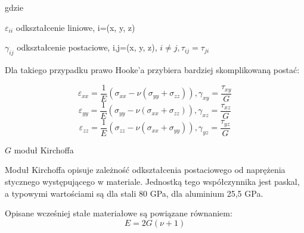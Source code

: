 gdzie

\begin{eqwhere}[2cm]
        \item[$\varepsilon_{ii}$] odkształcenie liniowe, i=(x, y, z)
        \item[$\gamma_{ij}$] odkształcenie postaciowe, i,j=(x, y, z), \( i \neq j, \tau_{ij}=\tau_{ji}\)
\end{eqwhere}

Dla takiego przypadku prawo Hooke'a przybiera bardziej skomplikowaną postać:

\begin{equation}
\varepsilon_{xx}=\frac{1}{E}(\sigma_{xx}-\nu(\sigma_{yy}+\sigma_{zz})), \gamma_{xy}=\frac{\tau_{xy}}{G}
\end{equation}
\begin{equation}
\varepsilon_{yy}=\frac{1}{E}(\sigma_{yy}-\nu(\sigma_{xx}+\sigma_{zz})), \gamma_{xz}=\frac{\tau_{xz}}{G}
\end{equation}
\begin{equation}
\varepsilon_{zz}=\frac{1}{E}(\sigma_{zz}-\nu(\sigma_{xx}+\sigma_{yy})), \gamma_{yz}=\frac{\tau_{yz}}{G}
\end{equation}

\begin{eqwhere}[2cm]
        \item[$G$] moduł Kirchoffa
\end{eqwhere}

	Moduł Kirchoffa opisuje zależność odkształcenia postaciowego od naprężenia stycznego występującego w materiale. Jednostką tego współczynnika jest paskal, a typowymi wartościami są dla stali 80 GPa, dla aluminium 25,5 GPa.

	Opisane wcześniej stałe materiałowe są powiązane równaniem:
\begin{equation}
E=2G(\nu+1)
\end{equation}

